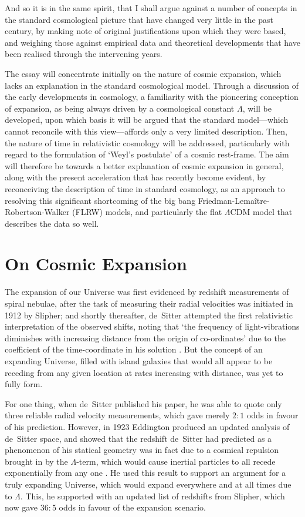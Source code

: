 \documentclass[11pt]{article}
\begin{document}
And so it is in the same spirit, that I shall argue against a number of concepts in the standard cosmological picture that have changed very little in the past century, by making note of original justifications upon which they were based, and weighing those against empirical data and theoretical developments that have been realised through the intervening years.

The essay will concentrate initially on the nature of cosmic expansion, which lacks an explanation in the standard cosmological model. Through a discussion of the early developments in cosmology, a familiarity with the pioneering conception of expansion, as being always driven by a cosmological constant $\Lambda$, will be developed, upon which basis it will be argued that the standard model---which cannot reconcile with this view---affords only a very limited description. Then, the nature of time in relativistic cosmology will be addressed, particularly with regard to the formulation of `Weyl's postulate' of a cosmic rest-frame. The aim will therefore be towards a better explanation of cosmic expansion in general, along with the present acceleration that has recently become evident, by reconceiving the description of time in standard cosmology, as an approach to resolving this significant shortcoming of the big bang Friedman-Lema\^{i}tre-Robertson-Walker (FLRW) models, and particularly the flat $\Lambda$CDM model that describes the data so well.

\section{On Cosmic Expansion \label{sec_OCE}}
The expansion of our Universe was first evidenced by redshift measurements of spiral nebulae, after the task of measuring their radial velocities was initiated in 1912 by Slipher; and shortly thereafter, %
de~Sitter attempted the first relativistic interpretation of the observed shifts, noting that `the frequency of light-vibrations diminishes with increasing distance from the origin of co-ordinates' due to the coefficient of the time-coordinate in his solution \cite{deSitter1917}. But the concept of an expanding Universe, filled with island galaxies that would all appear to be receding from any given location at rates increasing with distance, was yet to fully form.

For one thing, when de~Sitter published his paper, he was able to quote only three reliable radial velocity measurements, which gave merely $2:1$ odds in favour of his prediction. However, in 1923 Eddington produced an updated analysis of de~Sitter space, and showed that the redshift de~Sitter had predicted as a phenomenon of his statical geometry was in fact due to a cosmical repulsion brought in by the $\Lambda$-term, which would cause inertial particles to all recede exponentially from any one \cite{Eddington1923}. He used this result to support an argument for a truly expanding Universe, which would expand everywhere and at all times due to $\Lambda$. This, he supported with an updated list of redshifts from Slipher, which now gave $36:5$ odds in favour of the expansion scenario.
\end{document}
